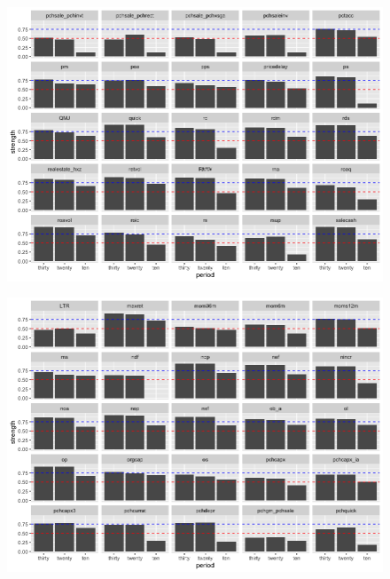 \documentclass[12pt]{article}
\begin{document}
\begin{landscape}
	\begin{figure}[ht]
		\includegraphics[scale = 0.7]{strength_comparison_V}
		\centering
	\end{figure}
\end{landscape}

\begin{landscape}
	\begin{figure}[ht]
		\includegraphics[scale = 0.7]{strength_comparison_IV}
		\centering
	\end{figure}
\end{landscape}
\end{document}
